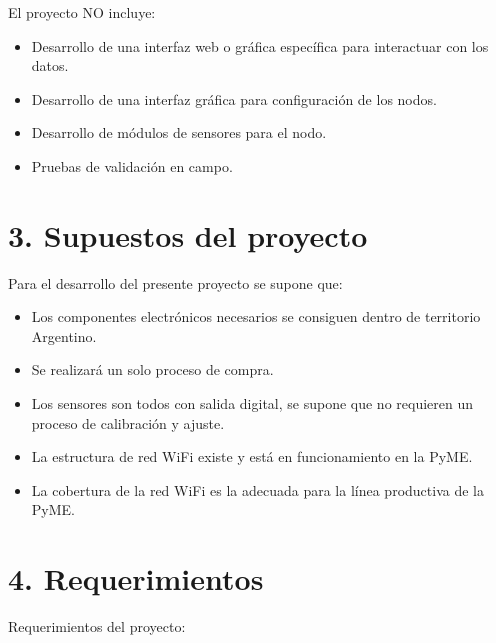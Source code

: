 \documentclass[11pt]{charter}
\begin{document}
El proyecto NO incluye:
\begin{itemize}
\item Desarrollo de una interfaz web o gráfica específica para interactuar con los datos.
\item Desarrollo de una interfaz gráfica para configuración de los nodos.
\item Desarrollo de módulos de sensores para el nodo.
\item Pruebas de validación en campo.
\end{itemize}


\section{3. Supuestos del proyecto}
\label{sec:supuestos}

Para el desarrollo del presente proyecto se supone que:

\begin{itemize}
\item Los componentes electrónicos necesarios se consiguen dentro de territorio Argentino.
\item Se realizará un solo proceso de compra.
\item Los sensores son todos con salida digital, se supone que no requieren un proceso de calibración y ajuste.
\item La estructura de red WiFi existe y está en funcionamiento en la PyME.
\item La cobertura de la red WiFi es la adecuada para la línea productiva de la PyME.
\end{itemize}

\section{4. Requerimientos}
\label{sec:requerimientos}

Requerimientos del proyecto:
\end{document}
